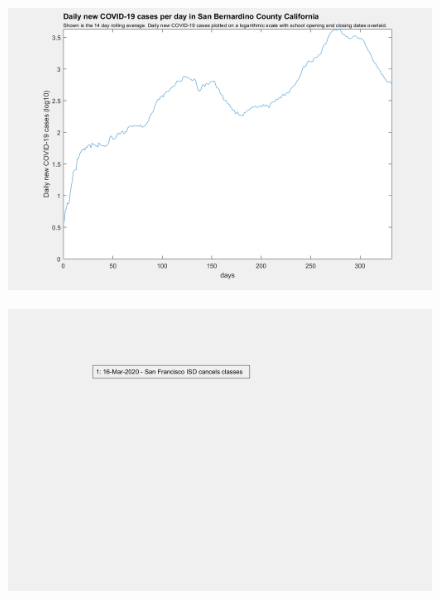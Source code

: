 \documentclass[]{article}
\begin{document}
\begin{figure}[!h]
	\includegraphics[width=\linewidth]{images/san_bernardino_cases_school_log.png}
	\caption{}
	\label{fig:images/san_bernardino_cases_school_logLabel}
\end{figure}

\begin{figure}[!h]
	\includegraphics[width=\linewidth]{legends/san_francisco_school_legend.png}
	\caption{}
	\label{fig:legends/san_francisco_school_legendLabel}
\end{figure}
\end{document}
